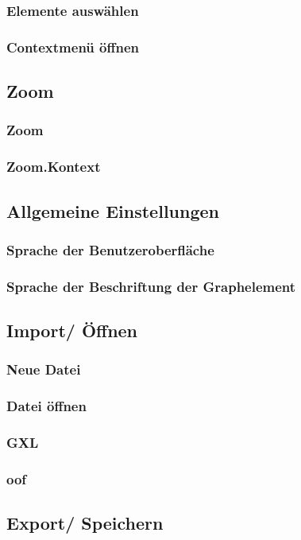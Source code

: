 \documentclass[enabledeprecatedfontcommands,fontsize=11pt,paper=a4,twoside]{scrartcl}
\begin{document}
		\subsubsection{Elemente auswählen}
		\subsubsection{Contextmenü öffnen}
		
	\subsection{Zoom}
		\subsubsection{Zoom}
		\subsubsection{Zoom.Kontext}
	\subsection{Allgemeine Einstellungen}
		\subsubsection{Sprache der Benutzeroberfläche}
		\subsubsection{Sprache der Beschriftung der Graphelement}
	\subsection{Import/ Öffnen}
		\subsubsection{Neue Datei}
		\subsubsection{Datei öffnen}
		\subsubsection{GXL}
		\subsubsection{oof}
	\subsection{Export/ Speichern}
\end{document}
